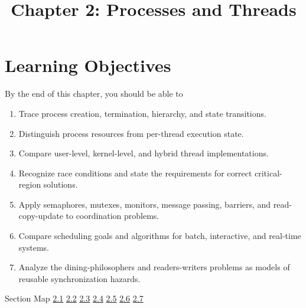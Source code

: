 \documentclass[10pt,letterpaper]{article}
\title{Chapter 2: Processes and Threads}
\author{}
\date{}
\begin{document}
\maketitle
\section*{Learning Objectives}
\begin{studybox}{By the end of this chapter, you should be able to}
\begin{enumerate}
  \item Trace process creation, termination, hierarchy, and state transitions.
  \item Distinguish process resources from per-thread execution state.
  \item Compare user-level, kernel-level, and hybrid thread implementations.
  \item Recognize race conditions and state the requirements for correct critical-region solutions.
  \item Apply semaphores, mutexes, monitors, message passing, barriers, and read-copy-update to coordination problems.
  \item Compare scheduling goals and algorithms for batch, interactive, and real-time systems.
  \item Analyze the dining-philosophers and readers-writers problems as models of reusable synchronization hazards.
\end{enumerate}
\end{studybox}

\begin{studybox}{Section Map}
\hyperlink{sec-2-1}{2.1} \quad \hyperlink{sec-2-2}{2.2} \quad \hyperlink{sec-2-3}{2.3} \quad \hyperlink{sec-2-4}{2.4} \quad \hyperlink{sec-2-5}{2.5} \quad \hyperlink{sec-2-6}{2.6} \quad \hyperlink{sec-2-7}{2.7}
\end{studybox}
\end{document}
